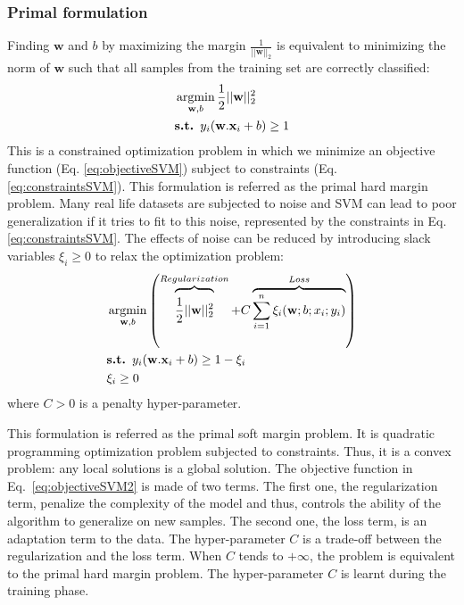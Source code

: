 \subsubsection{Primal formulation}
Finding $\textbf{w}$ and $b$ by maximizing the margin $\frac{1}{||\textbf{w}||_2}$ is equivalent to minimizing the norm of $\textbf{w}$ such that all samples from the training set are correctly classified:
	\begin{align}
		& \argmin_{\textbf{w},b} \frac{1}{2} ||\textbf{w}||_2^2 \label{eq:objectiveSVM}\\
		& \textbf{s.t. } y_i(\textbf{w}.\textbf{x}_i+b) \geq 1 \label{eq:constraintsSVM}
	\end{align}
This is a constrained optimization problem in which we minimize an objective function (Eq. \ref{eq:objectiveSVM}) subject to constraints (Eq. \ref{eq:constraintsSVM}). This formulation is referred as the primal hard margin problem. Many real life datasets are subjected to noise and SVM can lead to poor generalization if it tries to fit to this noise, represented by the constraints in Eq. \ref{eq:constraintsSVM}. The effects of noise can be reduced by introducing slack variables $\xi_i \geq 0$ to relax the optimization problem:
	\begin{align}
	& \argmin_{\textbf{w},b}  
	\left( 
	\overbrace{\vphantom{\sum_{i=1}^n \xi_i}
		\frac{1}{2}||\textbf{w}||^2_2}^{Regularization}
	+ C \overbrace{\sum\limits_{i=1}^{n}\xi_i(\textbf{w}; b; x_i; y_i)}^{Loss} \right) 
	\label{eq:objectiveSVM2}\\
	& \textbf{s.t. } y_i(\textbf{w}.\textbf{x}_i+b) \geq 1 -\xi_i \label{eq:constraintsSVM2} \\
	&  \xi_i \geq 0 \label{eq:constraintsSVM20}
	\end{align}
\noindent where $C > 0$ is a penalty hyper-parameter. 
	
This formulation is referred as the primal soft margin problem. It is quadratic programming optimization problem subjected to constraints. Thus, it is a convex problem: any local solutions is a global solution. The objective function in Eq.~\ref{eq:objectiveSVM2} is made of two terms. The first one, the regularization term, penalize the complexity of the model and thus, controls the ability of the algorithm to generalize on new samples. The second one, the loss term, is an adaptation term to the data. The hyper-parameter $C$ is a trade-off between the regularization and the loss term. When $C$ tends to $+\infty$, the problem is equivalent to the primal hard margin problem. The hyper-parameter $C$ is learnt during the training phase. 

